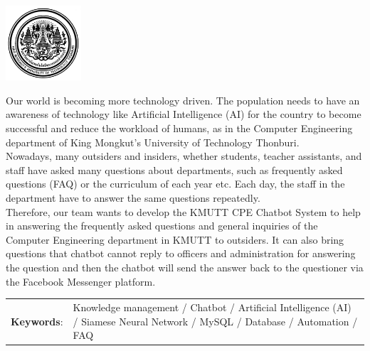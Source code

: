\documentclass[12pt,oneside,openright,a4paper]{cpe-english-project}
\begin{document}
\pdfstringdefDisableCommands{%
\let\MakeUppercase\relax
}
\begin{center}
  \includegraphics[width=2.8cm]{logo02.jpg}
\end{center}
\vspace*{-1cm}

\maketitlepage
\makesignaturepage 

\abstract

Our world is becoming more technology driven. The population needs to have an awareness of technology 
like Artificial Intelligence (AI) for the country to become successful and reduce the workload of humans, as 
in the Computer Engineering department of King Mongkut’s University of Technology Thonburi. \\
Nowadays, many outsiders and insiders, whether students, teacher assistants, and staff have asked many 
questions about departments, such as frequently asked questions (FAQ) or the curriculum of each year etc. 
Each day, the staff in the department have to answer the same questions repeatedly. \\
Therefore, our team wants to develop the KMUTT CPE Chatbot System to help in answering the frequently 
asked questions and general inquiries of the Computer Engineering department in KMUTT to outsiders. It 
can also bring questions that chatbot cannot reply to officers and administration for answering the question 
and then the chatbot will send the answer back to the questioner via the Facebook Messenger platform.

\begin{flushleft}
\begin{tabular*}{\textwidth}{@{}lp{}}
\textbf{Keywords}: & Knowledge management / Chatbot / Artificial Intelligence (AI) / Siamese Neural Network / MySQL / Database / Automation / FAQ
\end{tabular*}
\end{flushleft}
\endabstract
\end{document}
